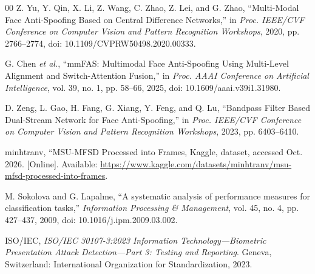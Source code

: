 \documentclass[a4paper,conference]{IEEEtran}
\begin{document}
\begin{thebibliography}{00}
Z. Yu, Y. Qin, X. Li, Z. Wang, C. Zhao, Z. Lei, and G. Zhao, ``Multi-Modal Face Anti-Spoofing Based on Central Difference Networks,'' in \emph{Proc. IEEE/CVF Conference on Computer Vision and Pattern Recognition Workshops}, 2020, pp. 2766--2774, doi: 10.1109/CVPRW50498.2020.00333.

G. Chen \emph{et al.}, ``mmFAS: Multimodal Face Anti-Spoofing Using Multi-Level Alignment and Switch-Attention Fusion,'' in \emph{Proc. AAAI Conference on Artificial Intelligence}, vol. 39, no. 1, pp. 58--66, 2025, doi: 10.1609/aaai.v39i1.31980.

D. Zeng, L. Gao, H. Fang, G. Xiang, Y. Feng, and Q. Lu, ``Bandpass Filter Based Dual-Stream Network for Face Anti-Spoofing,'' in \emph{Proc. IEEE/CVF Conference on Computer Vision and Pattern Recognition Workshops}, 2023, pp. 6403--6410.

minhtranv, ``MSU-MFSD Processed into Frames, Kaggle, dataset, accessed Oct. 2026. [Online]. Available: \url{https://www.kaggle.com/datasets/minhtranv/msu-mfsd-processed-into-frames}.

M. Sokolova and G. Lapalme, ``A systematic analysis of performance measures for classification tasks,'' \emph{Information Processing \& Management}, vol. 45, no. 4, pp. 427--437, 2009, doi: 10.1016/j.ipm.2009.03.002.

ISO/IEC, \emph{ISO/IEC 30107-3:2023 Information Technology---Biometric Presentation Attack Detection---Part 3: Testing and Reporting}. Geneva, Switzerland: International Organization for Standardization, 2023.

\end{thebibliography}
\end{document}
